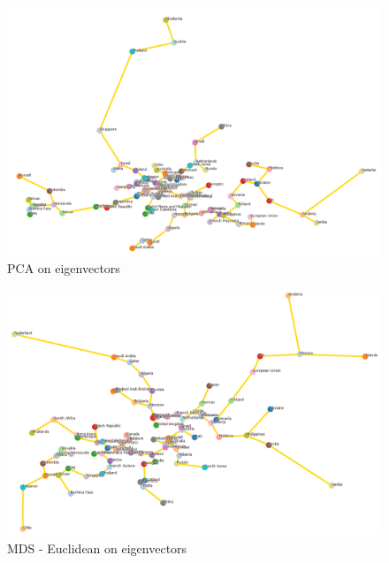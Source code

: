 \documentclass[11pt]{article}
\begin{document}
\begin{figure}[!htp]
\centering
\includegraphics[width=\textwidth]{../vis/country.eigens.vis.pca.png}
\caption{PCA on eigenvectors}
\label{fig:pcaEigenvectorsFigure}
\end{figure}

\begin{figure}[!htp]
\centering
\includegraphics[width=\textwidth]{../vis/country.eigens.vis.mds.euclidean.png}
\caption{MDS - Euclidean on eigenvectors}
\label{fig:mdsEuclideanEigenvectorsFigure}
\end{figure}
\end{document}
